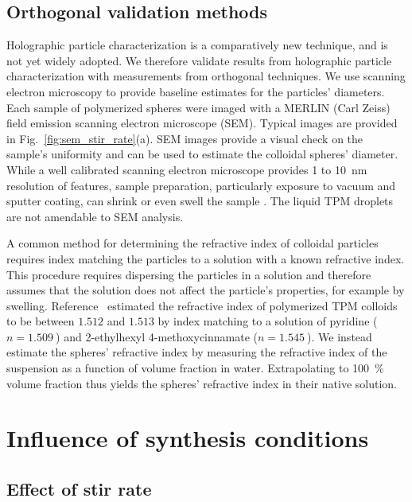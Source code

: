 \subsection{Orthogonal validation methods}

Holographic particle characterization is a comparatively new technique,
and is not yet widely adopted. We therefore validate results from
holographic particle characterization with measurements from orthogonal
techniques.
We use scanning electron microscopy to provide baseline estimates for the
particles' diameters.
Each sample of polymerized spheres were imaged with a MERLIN (Carl Zeiss) field
emission scanning electron microscope (SEM).
Typical images are provided in Fig.~\ref{fig:sem_stir_rate}(a).
SEM images provide a visual check on the sample's uniformity
and can be used to estimate the colloidal spheres' diameter. While a well calibrated scanning
electron microscope provides \num{1} to \SI{10}{\nm} resolution of features, sample
preparation, particularly exposure to vacuum and sputter coating, can shrink or
even swell the sample \cite{yamada85,jung02}. The liquid TPM droplets
are not amendable to SEM analysis.

A common method for determining the refractive index of colloidal particles
requires index matching the particles to a solution with a known refractive index.
This procedure requires dispersing the particles in a solution and therefore
assumes that the solution does not affect the particle's properties, for
example by swelling.  Reference~\cite{vanderwel17} estimated the
refractive index of polymerized TPM colloids to be between $\num{1.512}$ and $\num{1.513}$
by index matching to a solution of pyridine ($n = \SI{1.509}{}$) and \num{2}-ethylhexyl
\num{4}-methoxycinnamate ($n = \SI{1.545}{}$). We instead estimate the spheres'
refractive index by measuring the refractive index of the suspension as a function of
volume fraction in water. Extrapolating  to \SI{100}{\percent} volume fraction
thus yields the spheres' refractive index \cite{alexander81} in their native solution.

\section{Influence of synthesis conditions}
\subsection{Effect of stir rate}

